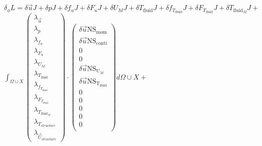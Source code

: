 \documentclass[10pt]{article} %
\begin{document}
\begin{center}
	$\delta_\phi L = \delta \vec{u} J + \delta p  J + \delta f_u J + \delta F_u J + \delta U_M J +
	\delta T_{\text{fluid}} J + \delta f_{T_{\text{fluid}}} J + \delta F_{T_{\text{fluid}}} J + \delta T_{\text{fluid}_M} J +$\\
	$\int_{\Omega \cup X}
	\begin{pmatrix}
		\lambda_{\vec{u}} \\ \lambda_p \\ \lambda_{f_u} \\ \lambda_{F_u} \\ \lambda_{U_M}\\ \lambda_{T_{\text{fluid}}} \\ \lambda_{f_{T_{\text{fluid}}}} \\ \lambda_{F_{T_{\text{fluid}}}} \\ \lambda_{T_{\text{fluid}_M}} \\ \lambda_{T_{structure}} \\ \lambda_{\vec{U}_{structure}}
	\end{pmatrix}
	\cdot
	\begin{pmatrix}
		\delta \vec{u} \text{NS}_{\text{mom}} \\
		\delta \vec{u} \text{NS}_{\text{conti}}\\
		0 \\
		0 \\
		\delta \vec{u} \text{NS}_{\text{U}_M} \\
		\delta \vec{u} \text{NS}_{\text{T}_{\text{fluid}}} \\
		0\\
		0\\
		0\\
		0\\
		0\\
	\end{pmatrix}
	d\Omega \cup X + $\\


\end{center}
\end{document}
